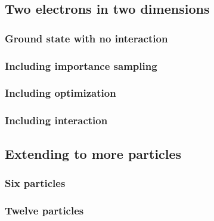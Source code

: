 \subsection{Two electrons in two dimensions}

\subsubsection{Ground state with no interaction}

\subsubsection{Including importance sampling}

\subsubsection{Including optimization}

\subsubsection{Including interaction}

\subsection{Extending to more particles}

\subsubsection{Six particles}

\subsubsection{Twelve particles}

